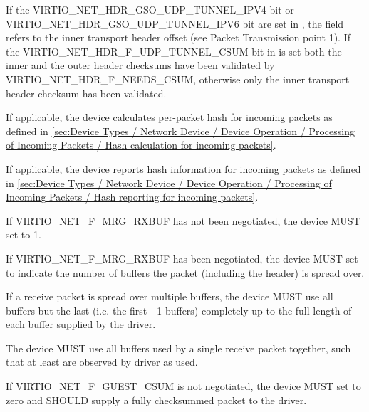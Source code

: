 \begin{enumerate}
\begin{note}
If the VIRTIO_NET_HDR_GSO_UDP_TUNNEL_IPV4 bit or VIRTIO_NET_HDR_GSO_UDP_TUNNEL_IPV6
bit are set in , the  field refers to
the inner transport header offset (see Packet Transmission point 1).
If the VIRTIO_NET_HDR_F_UDP_TUNNEL_CSUM bit in  is set both
the inner and the outer header checksums have been validated by
VIRTIO_NET_HDR_F_NEEDS_CSUM, otherwise only the inner transport header
checksum has been validated.
\end{note}
\end{enumerate}

If applicable, the device calculates per-packet hash for incoming packets as
defined in \ref{sec:Device Types / Network Device / Device Operation / Processing of Incoming Packets / Hash calculation for incoming packets}.

If applicable, the device reports hash information for incoming packets as
defined in \ref{sec:Device Types / Network Device / Device Operation / Processing of Incoming Packets / Hash reporting for incoming packets}.

\label{devicenormative:Device Types / Network Device / Device Operation / Processing of Packets}%

If VIRTIO_NET_F_MRG_RXBUF has not been negotiated, the device MUST set
 to 1.

If VIRTIO_NET_F_MRG_RXBUF has been negotiated, the device MUST set
 to indicate the number of buffers
the packet (including the header) is spread over.

If a receive packet is spread over multiple buffers, the device
MUST use all buffers but the last (i.e. the first  -
1 buffers) completely up to the full length of each buffer
supplied by the driver.

The device MUST use all buffers used by a single receive
packet together, such that at least  are
observed by driver as used.

If VIRTIO_NET_F_GUEST_CSUM is not negotiated, the device MUST set
 to zero and SHOULD supply a fully checksummed
packet to the driver.

